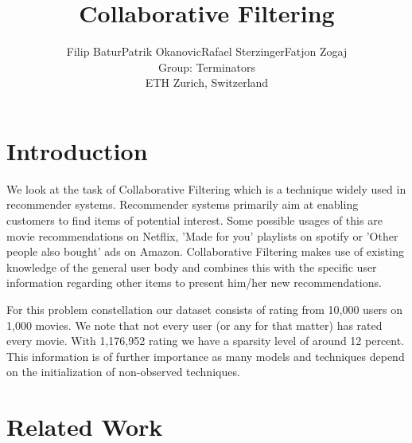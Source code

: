 \documentclass[10pt,conference,compsocconf]{IEEEtran}
\newcommand{\spacing}{\hspace{1cm}}
\begin{document}
    \title{Collaborative Filtering}

    \author{
    Filip Batur\spacing Patrik Okanovic\spacing Rafael Sterzinger\spacing Fatjon Zogaj\\
    Group: Terminators\\
    ETH Zurich, Switzerland
    }

    \maketitle

    \begin{abstract}

    \end{abstract}


    \section{Introduction}
    We look at the task of Collaborative Filtering which is a technique widely used in recommender systems.
    Recommender systems primarily aim at enabling customers to find items of potential interest.
    Some possible usages of this are movie recommendations on Netflix, 'Made for you' playlists on spotify or 'Other people also bought' ads on Amazon.
    Collaborative Filtering makes use of existing knowledge of the general user body and combines this with the specific user information regarding other items to present him/her new recommendations.

    For this problem constellation our dataset consists of rating from 10,000 users on 1,000 movies.
    We note that not every user (or any for that matter) has rated every movie.
    With 1,176,952 rating we have a sparsity level of around 12 percent.
    This information is of further importance as many models and techniques depend on the initialization of non-observed techniques.



    \section{Related Work}
\end{document}
